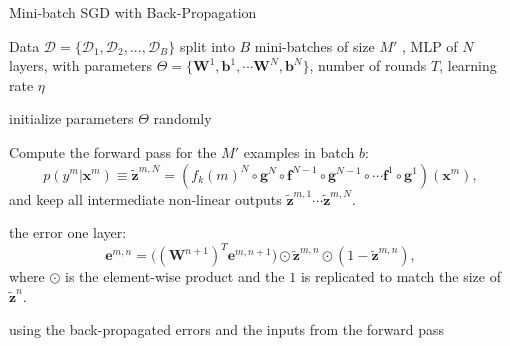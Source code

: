 \begin{algorithm}[t]
\label{algo:backprop}

   \caption{Mini-batch SGD with Back-Propagation \label{alg:maxent_gd}}

\begin{algorithmic}[1]

Data $\mathcal{D}=\{\mathcal{D}_1,\mathcal{D}_2,...,\mathcal{D}_B\}$ split into $B$ mini-batches of size $M'$%
, MLP of $N$ layers, with parameters $\Theta=\{\mathbf{W}^1, \mathbf{b}^1, \cdots \mathbf{W}^N, \mathbf{b}^N\}$, number of rounds $T$, learning rate $\eta$

   \STATE initialize parameters $\Theta$ randomly 


	\vspace{0.3cm}
	\STATE Compute the {forward pass} for the $M'$ examples in batch $b$:
    $$p(y^m|\mathbf{x}^m) \equiv \tilde{\mathbf{z}}^{m,N} = (f_k(m)^N \circ \mathbf{g}^N \circ \mathbf{f}^{N-1} \circ \mathbf{g}^{N-1} \circ \cdots \mathbf{f}^1 \circ \mathbf{g}^1)(\mathbf{x}^m),$$
	 and keep all intermediate non-linear outputs $\tilde{\mathbf{z}}^{m,1} \cdots \tilde{\mathbf{z}}^{m,N}$.
	
	\vspace{0.3cm}
        \ELSE
	     the error one layer:  
        $$\mathbf{e}^{m,n} = \Big((\mathbf{W}^{n+1})^T \mathbf{e}^{m,n+1}\Big) \odot \tilde{\mathbf{z}}^{m,n} \odot (\mathbf{\mathrm{1}}-\tilde{\mathbf{z}}^{m,n}),$$
        where $\odot$ is the element-wise product and the $\mathbf{\mathrm{1}}$ is replicated to match the size of $\tilde{\mathbf{z}}^n$.
        \ENDIF 

		\vspace{0.3cm}
         using the back-propagated errors and the inputs from the forward pass


\end{algorithmic}
\end{algorithm}
